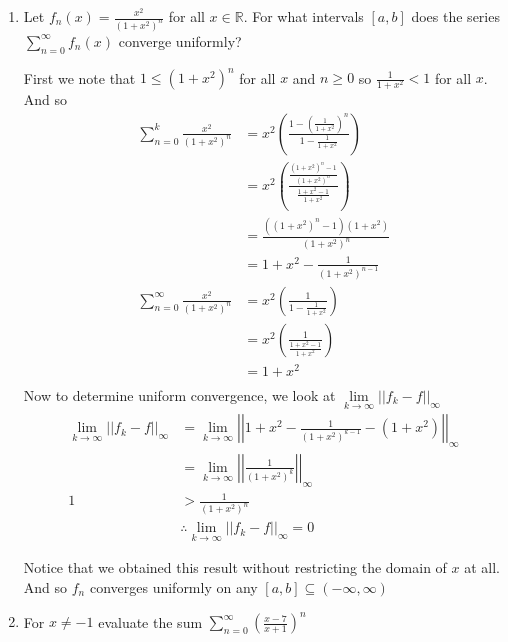 \documentclass[letterpaper]{article}
\begin{document}
\begin{enumerate}
  \item
  Let $f_n(x)=\frac{x^2}{(1+x^2)^n}$ for all $x\in \mathbb{R}$. For what intervals $[a,b]$ does the series $\sum\limits_{n=0}^\infty{f_n(x)}$ converge uniformly?

  First we note that $1\le (1+x^2)^n$ for all $x$ and $n\ge 0$ so $\frac{1}{1+x^2}<1$ for all $x$.
  And so
  \begin{align*}
  \sum\limits_{n=0}^k{\frac{x^2}{(1+x^2)^n}}
  &=x^2\left(\frac{1-(\frac{1}{1+x^2})^n}{1-\frac{1}{1+x^2}}\right)\\
  &=x^2\left(\frac{\frac{(1+x^2)^n-1}{(1+x^2)^n}}{\frac{1+x^2-1}{1+x^2}}\right)\\
  &=\frac{((1+x^2)^n-1)(1+x^2)}{(1+x^2)^n}\\
  &=1+x^2-\frac{1}{(1+x^2)^{n-1}}\\
  \sum\limits_{n=0}^\infty{\frac{x^2}{(1+x^2)^n}}
  &=x^2\left(\frac{1}{1-\frac{1}{1+x^2}}\right)\\
  &=x^2\left(\frac{1}{\frac{1+x^2-1}{1+x^2}}\right)\\
  &=1+x^2\\
  \end{align*}
  Now to determine uniform convergence, we look at $\lim\limits_{k\to\infty}\left|\left|f_k-f\right|\right|_\infty$
  \begin{align*}
   \lim\limits_{k\to\infty}\left|\left|f_k-f\right|\right|_\infty
   &=\lim\limits_{k\to\infty}\left|\left|1+x^2-\frac{1}{(1+x^2)^{k-1}}-(1+x^2)\right|\right|_\infty\\
   &=\lim\limits_{k\to\infty}\left|\left|\frac{1}{(1+x^2)^k}\right|\right|_\infty\\
   1&>\frac{1}{(1+x^2)^n}\\
   &\therefore \lim\limits_{k\to\infty}\left|\left|f_k-f\right|\right|_\infty
   =0
  \end{align*}

  Notice that we obtained this result without restricting the domain of $x$ at all. And so $f_n$ converges uniformly on any $[a,b]\subseteq (-\infty,\infty)$
\item
  For $x\ne -1$ evaluate the sum $\sum\limits_{n=0}^\infty{\left(\frac{x-7}{x+1}\right)^n}$


\end{enumerate}
\end{document}
